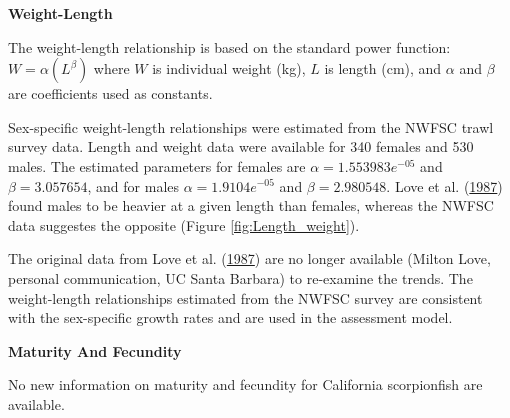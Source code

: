 \documentclass[12pt,]{article}
\begin{document}
\vspace{.5cm}

\textbf{Weight-Length}

The weight-length relationship is based on the standard power function:
\(W = \alpha(L^\beta)\) where \(W\) is individual weight (kg), \(L\) is
length (cm), and \(\alpha\) and \(\beta\) are coefficients used as
constants.

Sex-specific weight-length relationships were estimated from the NWFSC
trawl survey data. Length and weight data were available for 340 females
and 530 males. The estimated parameters for females are
\(\alpha = 1.553983e^{-05}\) and \(\beta = 3.057654\), and for males
\(\alpha = 1.9104e^{-05}\) and \(\beta = 2.980548\). Love et al.
(\protect\hyperlink{ref-Love1987}{1987}) found males to be heavier at a
given length than females, whereas the NWFSC data suggestes the opposite
(Figure \ref{fig:Length_weight}).

The original data from Love et al.
(\protect\hyperlink{ref-Love1987}{1987}) are no longer available (Milton
Love, personal communication, UC Santa Barbara) to re-examine the
trends. The weight-length relationships estimated from the NWFSC survey
are consistent with the sex-specific growth rates and are used in the
assessment model.

\vspace{.5cm}

\textbf{Maturity And Fecundity}

No new information on maturity and fecundity for California scorpionfish
are available.

\vspace{.5cm}
\end{document}
